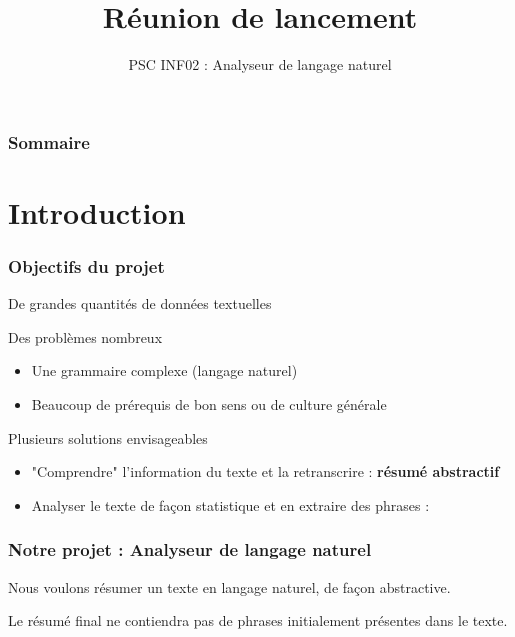 \documentclass{beamer}
\title{Réunion de lancement}
\subtitle{PSC INF02 : Analyseur de langage naturel}
\author{}
\institute{École polytechnique}
\date{}
\begin{document}
\begin{frame}
\titlepage

\end{frame}		
\begin{frame}
\frametitle{Sommaire}
			\tableofcontents[pausesections]
\end{frame}



\section{Introduction}

\begin{frame}%
\frametitle{Objectifs du projet}

\begin{block}{De grandes quantités de données textuelles}

\end{block}

\begin{block}{Des problèmes nombreux}
\begin{itemize}
 \item Une grammaire complexe (langage naturel)
 \item Beaucoup de prérequis de bon sens ou de culture générale
\end{itemize}

\end{block}


\begin{block}{Plusieurs solutions envisageables}
\begin{itemize}
\item "Comprendre" l'information du texte et la retranscrire : \textbf{résumé abstractif}
\item Analyser le texte de façon statistique et en extraire des phrases : 
\end{itemize}
\end{block}


\end{frame}


\begin{frame}
\frametitle{Notre projet : Analyseur de langage naturel}

Nous voulons résumer un texte en langage naturel, de façon abstractive.

Le résumé final ne contiendra pas de phrases initialement présentes dans le texte.

\end{frame}
\end{document}
